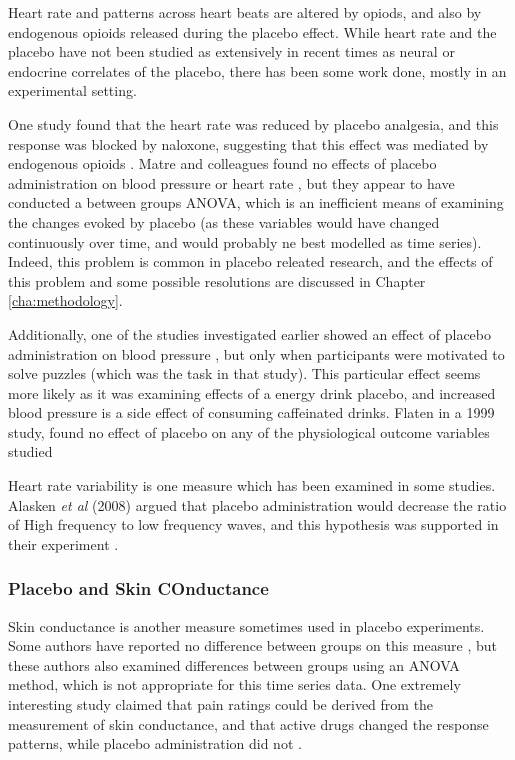 Heart rate and patterns across heart beats are altered by opiods, and also by endogenous opioids released during the placebo effect. While heart rate and the placebo have not been studied as extensively in recent times as neural or endocrine correlates of the placebo, there has been some work done, mostly in an experimental setting. 

One study found that the heart rate was reduced by placebo analgesia, and this response was blocked by naloxone, suggesting that this effect was mediated by endogenous opioids \cite{Benedetti2008}. Matre and colleagues found no effects of placebo administration on blood pressure or heart rate \cite{Matre2006a}, but they appear to have conducted a between groups ANOVA, which is an inefficient means of examining the changes evoked by placebo (as these variables would have changed continuously over time, and would probably ne best modelled as time series). Indeed, this problem is common in placebo releated research, and the effects of this problem and some possible resolutions are discussed in Chapter \ref{cha:methodology}. 

Additionally, one of the studies investigated earlier showed an effect of placebo administration on blood pressure \cite{Shiv2005a}, but only when participants were motivated to solve puzzles (which was the task in that study). This particular effect seems more likely as it was examining effects of a energy drink placebo, and increased blood pressure is a side effect of consuming caffeinated drinks. Flaten in a 1999 study, found no effect of placebo on any of the physiological outcome variables studied \cite{Flaten1999}

Heart rate variability is one measure which has been examined in some studies. Alasken \textit{et al } (2008) argued that placebo administration would decrease the ratio of High frequency to low frequency waves, and this hypothesis was supported in their experiment \cite{Aslaksen2008}. 

\subsubsection{Placebo and Skin COnductance}
\label{sec:plac-skin-cond}



Skin conductance is another measure sometimes used in placebo experiments. Some authors have reported no difference between groups on this measure \cite{Flaten1999}, but these authors also examined differences between groups using an ANOVA method, which is not appropriate for this time series data. One extremely interesting study claimed that pain ratings could be derived from the measurement of skin conductance, and that active drugs changed the response patterns, while placebo administration did not \cite{Fujita2000}.

